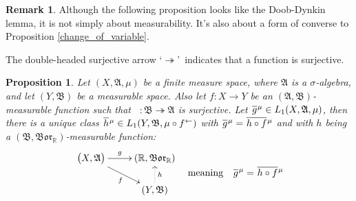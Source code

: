 \documentclass[
twoside=true,
paper=letter,
fontsize=9pt,
pagesize=auto,
leqno,
openany,
headsepline,
overfullrule,
]{scrbook}
\theoremstyle{plain}
\theoremstyle{plain}
\newtheorem{prop}[thm]{Proposition}
\theoremstyle{definition}
\newtheorem{rmk}[thm]{Remark}
\theoremstyle{bfnoteitalic}
\theoremstyle{bfnoteroman}
\newcommand{\sigalg}[1]{\mathfrak{#1}}
\newcommand{\borel}{\mathfrak{Bor}}
\newcommand{\textsigma}{\hbox{\large{$\sigma$}}\kern-1pt}
\newcommand{\preimage}[1]{\mathop{#1^{\leftarrow}}}
\newcommand{\R}{\mathbb{R}}
\newcommand{\sigmaalgebra}{\sigalg{A}}
\newcommand{\sigmaalgebraii}{\sigalg{B}}
\newcommand{\measurespace}{X}
\newcommand{\measurespaceii}{Y}
\newcommand{\measure}{\mu}
\newcommand*\xbar[1]{%
   \hbox{%
     \vbox{%
       \hrule height 0.4pt %
       \kern0.4ex%
       \hbox{%
         \ensuremath{#1}%
       }%
     }%
   }%
}
\newcommand{\lebclass}[1]{\hspace{.5pt}\xbar{#1}\hspace{0.5pt}}
\newcommand{\ellclass}[2]{\lebclass{#1}^{#2}}
\begin{document}
\begin{rmk}
Although the following proposition looks like the Doob-Dynkin lemma, it is not simply about measurability. It's also about a form of converse to Proposition \ref{change_of_variable}.

The double-headed surjective arrow \lq$\twoheadrightarrow$\rq\ indicates that a function is surjective.
\end{rmk}



\begin{prop}\label{factoring_functions}
Let $(\measurespace, \sigmaalgebra, \measure)$  be a finite measure space, where $\sigmaalgebra$ is a \textsigma-algebra, and let $(\measurespaceii, \sigmaalgebraii)$ be a measurable space.
Also let $f:\measurespace\to\measurespaceii$ be an $(\sigmaalgebra, \sigmaalgebraii)$\hyp{}measurable function such that 
$\preimage{f}:\sigmaalgebraii \twoheadrightarrow\sigmaalgebra$ is surjective.
Let
$\ellclass{g}{\measure}
\in L_1(\measurespace, \sigmaalgebra, \measure)$,
then there is a unique class
$\ellclass{h}{\measure}
\in L_1 (\measurespaceii, \sigmaalgebraii, \measure\circ\preimage{f})$
with 
$\ellclass{g}{\measure} 
= 
\ellclass{h\circ f}{\measure}$
and with $h$ being a $(\sigmaalgebraii, \borel_\R)$\hyp{}measurable function:
\[
\begin{gathered}
\xymatrix@R=16pt{ 
\bigl( \measurespace, \sigmaalgebra \bigr) \ar[r]^-{g} 
\ar[dr]_{f}
&
(\R,\borel_\R)  
\\
&
(\measurespaceii, \sigmaalgebraii) \ar@{.>}[u]_{h}
\\
}
\end{gathered}
\quad
\text{meaning}
\quad
\ellclass{g}{\measure}=\ellclass{h\circ f}{\measure}
\]
\end{prop}
\end{document}
